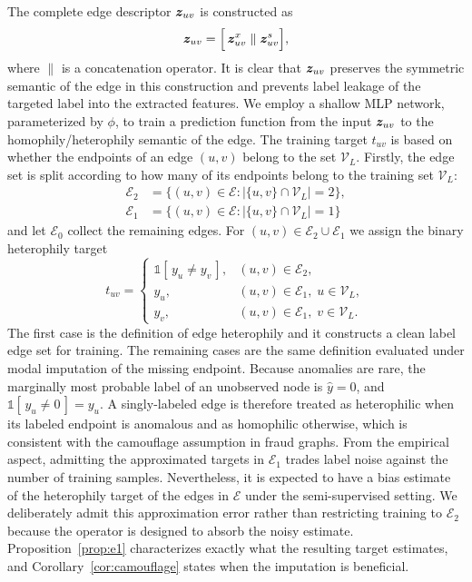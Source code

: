 The complete edge descriptor $\bm{z}_{uv}$ is constructed as 
\begin{equation}
    \bm{z}_{uv} = \Bigl[\,\bm{z}^{x}_{uv} \;\|\; \bm{z}^{s}_{uv} \Bigr],
    \label{eq:zuv}
\end{equation}
where $\|$ is a concatenation operator.
It is clear that $\bm{z}_{uv}$ preserves the symmetric semantic of the edge in this construction and prevents label leakage of the targeted label into the extracted features.
We employ a shallow MLP network, parameterized by $\phi$, to train a prediction function from the input $\bm{z}_{uv}$ to the homophily/heterophily semantic of the edge.
The training target $t_{uv}$ is based on whether the endpoints of an edge $(u, v)$ belong to the set $\mathcal{V}_L$.
Firstly, the edge set is split according to how many of its endpoints belong to the training set $\mathcal{V}_L$:
\begin{align}
  \mathcal{E}_2 &= \{(u,v)\in\mathcal{E} :   |\{u, v\} \cap \mathcal{V}_L| = 2 \} \label{eq:tuvE2}, \\
  \mathcal{E}_1 &= \{(u,v)\in\mathcal{E} : |\{u, v\} \cap \mathcal{V}_L| = 1 \} \label{eq:tuvE1}
\end{align}
and let $\mathcal{E}_0$ collect the remaining edges.
For $(u,v)\in\mathcal{E}_2\cup\mathcal{E}_1$
we assign the binary heterophily target
\begin{equation}
  t_{uv} =
  \begin{cases}
    \mathds{1}\!\left[\, y_u \neq y_v \,\right], & (u,v)\in\mathcal{E}_2,\\[2pt]
    y_u, & (u,v)\in\mathcal{E}_1,\; u \in \mathcal{V}_L,\\[2pt]
    y_v, & (u,v)\in\mathcal{E}_1,\; v \in \mathcal{V}_L .
  \end{cases}
  \label{eq:edge-target}
\end{equation}
The first case is the definition of edge heterophily and it constructs a clean label edge set for training.
The remaining cases are the same definition evaluated under modal imputation of the missing endpoint.
Because anomalies are rare, the marginally most probable label of an unobserved node is
$\hat{y}=0$, and $\mathds{1}[\,y_u \neq 0\,] = y_u$.
A singly-labeled edge is therefore treated as
heterophilic when its labeled endpoint is anomalous and as homophilic otherwise, which is consistent with the camouflage assumption in fraud graphs.
From the empirical aspect, admitting the approximated targets in $\mathcal{E}_1$ trades label noise against the number of training samples.
Nevertheless, it is expected to have a bias estimate of the heterophily target of the edges in $\mathcal{E}$ under the semi-supervised setting.
We deliberately admit this approximation error rather than restricting training to $\mathcal{E}_2$ because the operator is designed to absorb the noisy estimate.
Proposition~\ref{prop:e1} characterizes exactly what the resulting target estimates, and Corollary~\ref{cor:camouflage} states when the imputation is beneficial.

